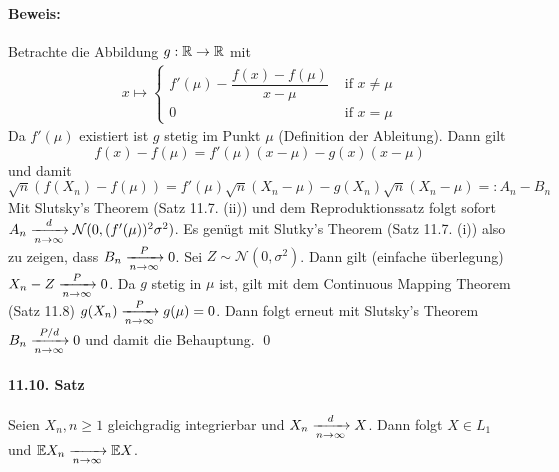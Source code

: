 \documentclass[11pt]{report}
\begin{document}
\paragraph{Beweis:}Betrachte die Abbildung $g:\mathbb{R}\to\mathbb{R}$ mit 
\begin{align*}
    x\mapsto
\begin{cases}
    f'(\mu)-\dfrac{f(x)-f(\mu)}{x-\mu} &\text{ if }x\neq\mu \\
    0 &\text{ if } x=\mu
\end{cases}
\end{align*}
Da $f'(\mu)$ existiert ist $g$ stetig im Punkt $\mu$ (Definition der Ableitung). Dann gilt 
$$f(x)-f(\mu)=f'(\mu)(x-\mu)-g(x)(x-\mu)$$
und damit
$$\sqrt{n}(f(X_n)-f(\mu))=f'(\mu)\sqrt{n}(X_n-\mu)-g(X_n)\sqrt{n}(X_n-\mu)=:A_n-B_n$$
Mit Slutsky's Theorem (Satz 11.7. (ii)) und dem Reproduktionssatz folgt sofort $A_n\nto{d}{n\to\infty}\mathcal{N}(0,(f'(\mu))^2\sigma^2)$. Es gen\"ugt mit Slutky's Theorem (Satz 11.7. (i)) also zu zeigen, dass $B_n\nto{P}{n\to\infty}0$. \newline\newline
Sei $Z\sim\mathcal{N}(0,\sigma^2)$. Dann gilt (einfache \"uberlegung) $X_n-Z\nto{P}{n\to\infty}0$. Da $g$ stetig in $\mu$ ist, gilt mit dem Continuous Mapping Theorem (Satz 11.8) $g(X_n)\nto{P}{n\to\infty}g(\mu)=0$. Dann folgt erneut mit Slutsky's Theorem $B_n\nto{P/d}{n\to\infty}0$ und damit die Behauptung. \qed

\paragraph{11.10. Satz} Seien $X_n,n\geq 1$ gleichgradig integrierbar und $X_n\nto{d}{n\to\infty}X$. Dann folgt $X\in L_1$ und $\E X_n\nto{}{n\to\infty}\E X$.

\end{document}
